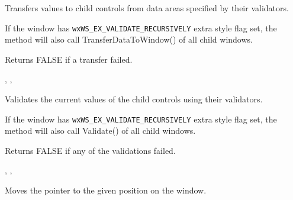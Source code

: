 \label{wxwindowtransferdatatowindow}


Transfers values to child controls from data areas specified by their validators.

If the window has {\tt wxWS\_EX\_VALIDATE\_RECURSIVELY} extra style flag set,
the method will also call TransferDataToWindow() of all child windows.


Returns FALSE if a transfer failed.


,\rtfsp
{}, 

\label{wxwindowvalidate}


Validates the current values of the child controls using their validators.

If the window has {\tt wxWS\_EX\_VALIDATE\_RECURSIVELY} extra style flag set,
the method will also call Validate() of all child windows.


Returns FALSE if any of the validations failed.


,\rtfsp
{},\rtfsp
{}

\label{wxwindowwarppointer}


Moves the pointer to the given position on the window.




